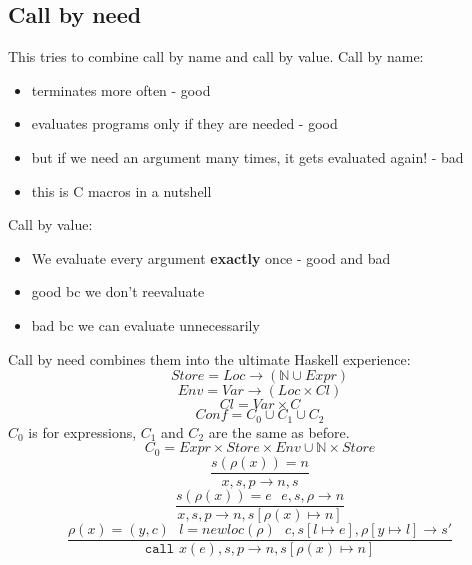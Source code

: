 \documentclass{article}
\begin{document}
\subsection{Call by need}
This tries to combine call by name and call by value.
Call by name:
\begin{itemize}
	\item terminates more often - good
	\item evaluates programs only if they are needed - good
	\item but if we need an argument many times, it gets evaluated again! - bad
	\item this is C macros in a nutshell
\end{itemize}
Call by value:
\begin{itemize}
	\item We evaluate every argument \textbf{exactly} once - good and bad
	\item good bc we don't reevaluate
	\item bad bc we can evaluate unnecessarily
\end{itemize}
Call by need combines them into the ultimate Haskell experience:
$$Store=Loc \rightarrow (\mathbb{N}\cup Expr)$$
$$Env=Var \rightarrow (Loc\times Cl)$$
$$Cl=Var\times C$$
$$Conf=C_0\cup C_1\cup C_2$$
$C_0$ is for expressions, $ C_1 $ and $ C_2 $ are the same as before.
$$C_0=Expr\times Store\times Env\cup \mathbb{N}\times Store$$
$$\frac{s(\rho(x))=n}{x,s,p \rightarrow n, s}$$
$$\frac{
	s(\rho(x))=e\ \ \ 
	e,s,\rho \rightarrow n
}{
	x,s,p \rightarrow n,s[\rho(x)\mapsto n]
}$$
$$\frac{
	\rho(x)=(y,c)\ \ \ 
	l=newloc(\rho)\ \ \ 
	c,s[l\mapsto e],\rho[y\mapsto l] \rightarrow s'
}{
	\texttt{call }x(e),s,p \rightarrow n,s[\rho(x)\mapsto n]
}$$
\end{document}

